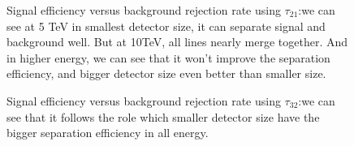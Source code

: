 \begin{figure}
\begin{center}
\end{center}
\caption{Signal efficiency versus background rejection rate using $\tau_{21}$:we can see at 5 TeV in smallest detector size, it can separate signal and background well. But at 10TeV, all lines nearly merge together. And in higher energy, we can see that it won't improve the separation efficiency, and bigger detector size even better than smaller size.}
\label{fig:cluster_tau21}
\end{figure}


\begin{figure}
\begin{center}
\end{center}
\caption{Signal efficiency versus background rejection rate using $\tau_{32}$:we can see that it follows the role which smaller detector size have the bigger separation efficiency in all energy.}
\label{fig:cluster_tau32}
\end{figure}

